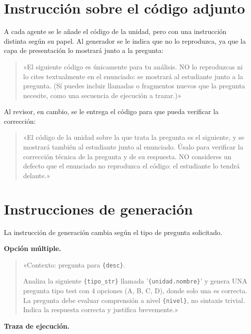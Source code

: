 \section{Instrucción sobre el código adjunto}
\label{sec:anexo-codigo}

A cada agente se le añade el código de la unidad, pero con una instrucción
distinta según su papel. Al generador se le indica que no lo reproduzca, ya que
la capa de presentación lo mostrará junto a la pregunta:

\begin{quote}\small
«El siguiente código es únicamente para tu análisis. NO lo reproduzcas ni lo
cites textualmente en el enunciado: se mostrará al estudiante junto a la
pregunta. (Sí puedes incluir llamadas o fragmentos nuevos que la pregunta
necesite, como una secuencia de ejecución a trazar.)»
\end{quote}

Al revisor, en cambio, se le entrega el código para que pueda verificar la
corrección:

\begin{quote}\small
«El código de la unidad sobre la que trata la pregunta es el siguiente, y se
mostrará también al estudiante junto al enunciado. Úsalo para verificar la
corrección técnica de la pregunta y de su respuesta. NO consideres un defecto
que el enunciado no reproduzca el código: el estudiante lo tendrá delante.»
\end{quote}


\section{Instrucciones de generación}
\label{sec:anexo-generacion}

La instrucción de generación cambia según el tipo de pregunta solicitado.

\textbf{Opción múltiple.}

\begin{quote}\small
«Contexto: pregunta para \texttt{\{desc\}}.

Analiza la siguiente \texttt{\{tipo\_str\}} llamada '\texttt{\{unidad.nombre\}}'
y genera UNA pregunta tipo test con 4 opciones (A, B, C, D), donde solo una es
correcta. La pregunta debe evaluar comprensión a nivel \texttt{\{nivel\}}, no
sintaxis trivial. Indica la respuesta correcta y justifica brevemente.»
\end{quote}

\textbf{Traza de ejecución.}

